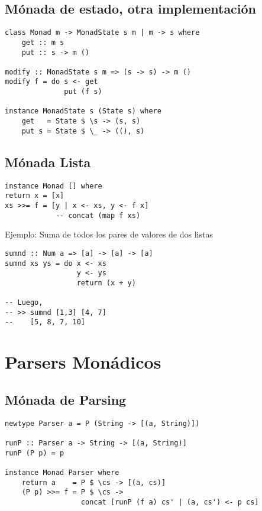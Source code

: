 \documentclass{article}
\begin{document}
\subsection{Mónada de estado, otra implementación}

\begin{lstlisting}
class Monad m -> MonadState s m | m -> s where
    get :: m s
    put :: s -> m ()

modify :: MonadState s m => (s -> s) -> m ()
modify f = do s <- get
              put (f s)

instance MonadState s (State s) where
    get   = State $ \s -> (s, s)
    put s = State $ \_ -> ((), s)
\end{lstlisting}

\subsection{Mónada Lista}

\begin{lstlisting}
instance Monad [] where
return x = [x]
xs >>= f = [y | x <- xs, y <- f x]
            -- concat (map f xs)
\end{lstlisting}

Ejemplo: Suma de todos los pares de valores de dos listas

\begin{lstlisting}
sumnd :: Num a => [a] -> [a] -> [a]
sumnd xs ys = do x <- xs
                 y <- ys
                 return (x + y)
                 
-- Luego, 
-- >> sumnd [1,3] [4, 7]
--    [5, 8, 7, 10]     
\end{lstlisting}

\section{Parsers Monádicos}\label{sec:parsers_monadicos}

\subsection{Mónada de Parsing}

\begin{lstlisting}
newtype Parser a = P (String -> [(a, String)])

runP :: Parser a -> String -> [(a, String)]
runP (P p) = p

instance Monad Parser where
    return a    = P $ \cs -> [(a, cs)]
    (P p) >>= f = P $ \cs ->
                  concat [runP (f a) cs' | (a, cs') <- p cs]
\end{lstlisting}
\end{document}

